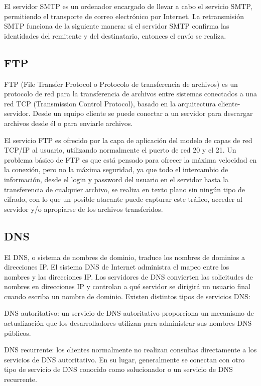 El servidor SMTP es un ordenador encargado de llevar a cabo el servicio SMTP, permitiendo el transporte de correo electrónico por Internet. La retransmisión SMTP funciona de la siguiente manera: si el servidor SMTP confirma las identidades del remitente y del destinatario, entonces el envío se realiza.

\subsection{FTP}
\noindent
FTP (File Transfer Protocol o Protocolo de transferencia de archivos) es un protocolo de red para la transferencia de archivos entre sistemas conectados a una red TCP (Transmission Control Protocol), basado en la arquitectura cliente-servidor. Desde un equipo cliente se puede conectar a un servidor para descargar archivos desde él o para enviarle archivos.

El servicio FTP es ofrecido por la capa de aplicación del modelo de capas de red TCP/IP al usuario, utilizando normalmente el puerto de red 20 y el 21. Un problema básico de FTP es que está pensado para ofrecer la máxima velocidad en la conexión, pero no la máxima seguridad, ya que todo el intercambio de información, desde el login y password del usuario en el servidor hasta la transferencia de cualquier archivo, se realiza en texto plano sin ningún tipo de cifrado, con lo que un posible atacante puede capturar este tráfico, acceder al servidor y/o apropiarse de los archivos transferidos.

\subsection{DNS}
\noindent
El DNS, o sistema de nombres de dominio, traduce los nombres de dominios a direcciones IP. El sistema DNS de Internet administra el mapeo entre los nombres y las direcciones IP. Los servidores de DNS convierten las solicitudes de nombres en direcciones IP y controlan a qué servidor se dirigirá un usuario final cuando escriba un nombre de dominio. 
Existen distintos tipos de servicios DNS:

DNS autoritativo: un servicio de DNS autoritativo proporciona un mecanismo de actualización que los desarrolladores utilizan para administrar sus nombres DNS públicos.

DNS recurrente: los clientes normalmente no realizan consultas directamente a los servicios de DNS autoritativo. En su lugar, generalmente se conectan con otro tipo de servicio de DNS conocido como solucionador o un servicio de DNS recurrente.
